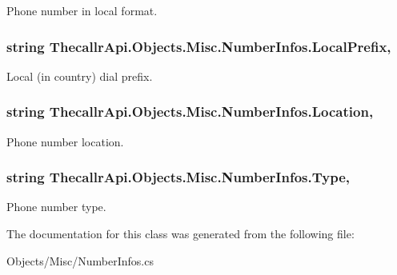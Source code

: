 Phone number in local format. 

\hypertarget{class_thecallr_api_1_1_objects_1_1_misc_1_1_number_infos_a48934ffd8f152c14a58c123ce24d8a16}{
\subsubsection[{Local\+Prefix}]{\setlength{\rightskip}{0pt plus 5cm}string Thecallr\+Api.\+Objects.\+Misc.\+Number\+Infos.\+Local\+Prefix\hspace{0.3cm}{\ttfamily [get]}, {\ttfamily [set]}}}\label{class_thecallr_api_1_1_objects_1_1_misc_1_1_number_infos_a48934ffd8f152c14a58c123ce24d8a16}


Local (in country) dial prefix. 

\hypertarget{class_thecallr_api_1_1_objects_1_1_misc_1_1_number_infos_a70092e14f6adb050009573a4174f8fb2}{
\subsubsection[{Location}]{\setlength{\rightskip}{0pt plus 5cm}string Thecallr\+Api.\+Objects.\+Misc.\+Number\+Infos.\+Location\hspace{0.3cm}{\ttfamily [get]}, {\ttfamily [set]}}}\label{class_thecallr_api_1_1_objects_1_1_misc_1_1_number_infos_a70092e14f6adb050009573a4174f8fb2}


Phone number location. 

\hypertarget{class_thecallr_api_1_1_objects_1_1_misc_1_1_number_infos_ae4ba0a4313475b612d4b5167f332eea9}{
\subsubsection[{Type}]{\setlength{\rightskip}{0pt plus 5cm}string Thecallr\+Api.\+Objects.\+Misc.\+Number\+Infos.\+Type\hspace{0.3cm}{\ttfamily [get]}, {\ttfamily [set]}}}\label{class_thecallr_api_1_1_objects_1_1_misc_1_1_number_infos_ae4ba0a4313475b612d4b5167f332eea9}


Phone number type. 



The documentation for this class was generated from the following file\+:\begin{DoxyCompactItemize}
\item 
Objects/\+Misc/Number\+Infos.\+cs\end{DoxyCompactItemize}
